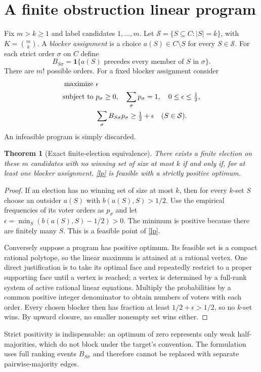 \documentclass[11pt]{article}
\newtheorem{theorem}{Theorem}
\theoremstyle{definition}
\newcommand{\Ind}{\mathbf 1}
\begin{document}
\section{A finite obstruction linear program}
Fix $m>k\ge1$ and label candidates $1,\ldots,m$. Let
$\mathcal S=\{S\subseteq C:|S|=k\}$, with $K=\binom mk$.
A \emph{blocker assignment} is a choice $a(S)\in C\setminus S$ for every
$S\in\mathcal S$. For each strict order $\sigma$ on $C$ define
\[
 B_{S\sigma}=\Ind\{a(S)\text{ precedes every member of }S\text{ in }\sigma\}.
\]
There are $m!$ possible orders. For a fixed blocker assignment consider
\begin{align}
 \text{maximize }&\epsilon \label{lp}\\
 \text{subject to }&p_\sigma\ge0,\quad \sum_\sigma p_\sigma=1,
                       \quad 0\le\epsilon\le\tfrac12,\notag\\
 &\sum_\sigma B_{S\sigma}p_\sigma\ge\tfrac12+\epsilon
                         \quad(S\in\mathcal S).\notag
\end{align}
An infeasible program is simply discarded.
\begin{theorem}[Exact finite-election equivalence]\label{equivalence}
There exists a finite election on these $m$ candidates with no winning
set of size at most $k$ if and only if, for at least one blocker assignment,
\eqref{lp} is feasible with a strictly positive optimum.
\end{theorem}
\begin{proof}
If an election has no winning set of size at most $k$, then for every
$k$-set $S$ choose an outsider $a(S)$ with $b(a(S),S)>1/2$. Use the
empirical frequencies of its voter orders as $p_\sigma$ and let
$\epsilon=\min_S(b(a(S),S)-1/2)>0$. The minimum is positive because
there are finitely many $S$. This is a feasible point of \eqref{lp}.

Conversely suppose a program has positive optimum. Its feasible set is
a compact rational polytope, so the linear maximum is attained at a
rational vertex. One direct justification is to take its optimal face
and repeatedly restrict to a proper supporting face until a vertex is
reached; a vertex is determined by a full-rank system of active rational
linear equations. Multiply the probabilities by a common positive
integer denominator to obtain numbers of voters with each order.
Every chosen blocker then has fraction at least $1/2+\epsilon>1/2$,
so no $k$-set wins. By upward closure, no smaller nonempty set wins either.
\end{proof}
Strict positivity is indispensable: an optimum of zero represents only
weak half-majorities, which do not block under the target's convention.
The formulation uses full ranking events $B_{S\sigma}$ and therefore
cannot be replaced with separate pairwise-majority edges.
\end{document}

